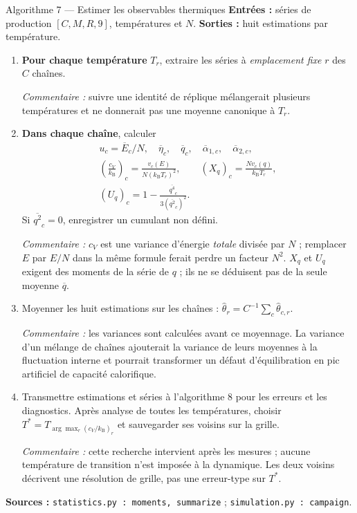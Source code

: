 \documentclass[10pt,a4paper]{article}
\newcommand{\kb}{k_{\mathrm B}}
\begin{document}
\begin{algocode}{Algorithme 7 --- Estimer les observables thermiques}
\textbf{Entrées :} séries de production $[C,M,R,9]$, températures et $N$.
\textbf{Sorties :} huit estimations par température.
\begin{enumerate}
\item \textbf{Pour chaque température} $T_r$, extraire les séries à
\emph{emplacement fixe} $r$ des $C$ chaînes.
\par\textit{Commentaire :} suivre une identité de réplique mélangerait
plusieurs températures et ne donnerait pas une moyenne canonique à $T_r$.
\item \textbf{Dans chaque chaîne}, calculer
\[
\begin{gathered}
u_c=\overline E_c/N,\quad
\overline\eta_c,\quad\overline q_c,\quad
\overline\alpha_{1,c},\quad\overline\alpha_{2,c},\\
\left(\frac{c_V}{\kb}\right)_c=\frac{v_c(E)}{N(\kb T_r)^2},\qquad
(X_q)_c=\frac{N v_c(q)}{\kb T_r},\\
(U_q)_c=1-\frac{\overline{q^4}_c}{3(\overline{q^2}_c)^2}.
\end{gathered}
\]
Si $\overline{q^2}_c=0$, enregistrer un cumulant non défini.
\par\textit{Commentaire :} $c_V$ est une variance d'énergie \emph{totale}
divisée par $N$ ; remplacer $E$ par $E/N$ dans la même formule ferait
perdre un facteur $N^2$. $X_q$ et $U_q$ exigent des moments de la série de
$q$ ; ils ne se déduisent pas de la seule moyenne $\overline q$.
\item Moyenner les huit estimations sur les chaînes :
$\widehat\theta_r=C^{-1}\sum_c\widehat\theta_{c,r}$.
\par\textit{Commentaire :} les variances sont calculées avant ce
moyennage. La variance d'un mélange de chaînes ajouterait la variance de
leurs moyennes à la fluctuation interne et pourrait transformer un défaut
d'équilibration en pic artificiel de capacité calorifique.
\item Transmettre estimations et séries à l'algorithme 8 pour les erreurs
et les diagnostics. Après analyse de toutes les températures, choisir
$T^*=T_{\arg\max_r(c_V/\kb)_r}$ et sauvegarder ses voisins sur la grille.
\par\textit{Commentaire :} cette recherche intervient après les mesures ;
aucune température de transition n'est imposée à la dynamique. Les deux
voisins décrivent une résolution de grille, pas une erreur-type sur $T^*$.
\end{enumerate}
\textbf{Sources :} \texttt{statistics.py : moments, summarize} ;
\texttt{simulation.py : campaign}.
\end{algocode}
\end{document}
